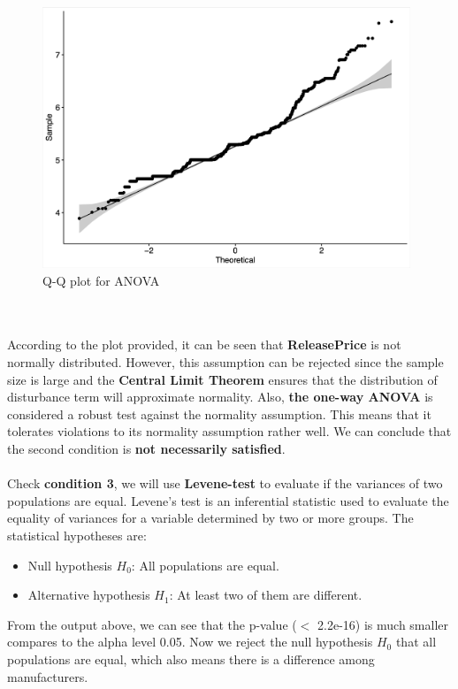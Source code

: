 \documentclass[a4paper]{article}
\theoremstyle{definition}
\begin{document}
\begin{figure}[h!]
\begin{center}
\includegraphics[width=11cm]{images/qqplot.png}
\end{center}
\caption{Q-Q plot for ANOVA}
\end{figure}
\\
\\
According to the plot provided, it can be seen that \textbf{Release\textunderscore Price} is not normally distributed. However, this assumption can be rejected since the sample size is large and the \textbf{Central Limit Theorem} ensures that the distribution of disturbance term will approximate normality. Also, \textbf{the one-way ANOVA} is considered a robust test against the normality assumption. This means that it tolerates violations to its normality assumption rather well. We can conclude that the second condition is \textbf{not necessarily satisfied}.\\
\\
Check \textbf{condition 3}, we will use \textbf{Levene-test} to evaluate if the variances of two populations are equal. Levene’s test is an inferential statistic used to evaluate the equality of variances for a variable determined by two or more groups. The statistical hypotheses are:
\begin{itemize}
    \item Null hypothesis $H_{0}$: All populations are equal.
    \item Alternative hypothesis $H_{1}$: At least two of them are different.
\end{itemize}

From the output above, we can see that the p-value ($<$ 2.2e-16) is much smaller compares to the alpha level 0.05. Now we reject the null hypothesis $H_{0}$ that all populations are equal, which also means there is a difference among manufacturers.\\
\end{document}
